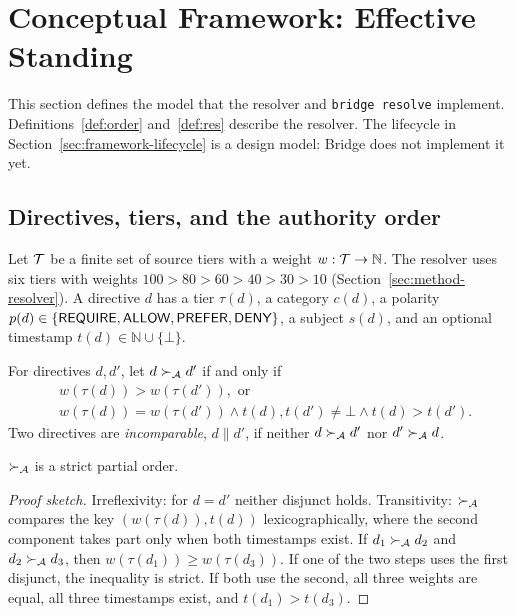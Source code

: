 \section{Conceptual Framework: Effective Standing}
\label{sec:framework}

This section defines the model that the resolver and \texttt{bridge resolve} implement. Definitions~\ref{def:order} and~\ref{def:res} describe the resolver. The lifecycle in Section~\ref{sec:framework-lifecycle} is a design model: Bridge does not implement it yet.

\subsection{Directives, tiers, and the authority order}
Let $\mathcal{T}$ be a finite set of source tiers with a weight $w : \mathcal{T} \to \mathbb{N}$. The resolver uses six tiers with weights $100 > 80 > 60 > 40 > 30 > 10$ (Section~\ref{sec:method-resolver}). A directive $d$ has a tier $\tau(d)$, a category $c(d)$, a polarity $p(d) \in \{\textsf{REQUIRE}, \textsf{ALLOW}, \textsf{PREFER}, \textsf{DENY}\}$, a subject $s(d)$, and an optional timestamp $t(d) \in \mathbb{N} \cup \{\bot\}$.

\begin{definition}
\label{def:order}
For directives $d, d'$, let $d \succ_{\mathcal{A}} d'$ if and only if
\begin{align*}
& w(\tau(d)) > w(\tau(d')), \text{ or}\\
& w(\tau(d)) = w(\tau(d')) \land t(d), t(d') \neq \bot \land t(d) > t(d').
\end{align*}
Two directives are \emph{incomparable}, $d \parallel d'$, if neither $d \succ_{\mathcal{A}} d'$ nor $d' \succ_{\mathcal{A}} d$.
\end{definition}

\begin{proposition}
$\succ_{\mathcal{A}}$ is a strict partial order.
\end{proposition}
\begin{proof}[Proof sketch]
Irreflexivity: for $d = d'$ neither disjunct holds. Transitivity: $\succ_{\mathcal{A}}$ compares the key $(w(\tau(d)), t(d))$ lexicographically, where the second component takes part only when both timestamps exist. If $d_1 \succ_{\mathcal{A}} d_2$ and $d_2 \succ_{\mathcal{A}} d_3$, then $w(\tau(d_1)) \ge w(\tau(d_3))$. If one of the two steps uses the first disjunct, the inequality is strict. If both use the second, all three weights are equal, all three timestamps exist, and $t(d_1) > t(d_3)$.
\end{proof}

